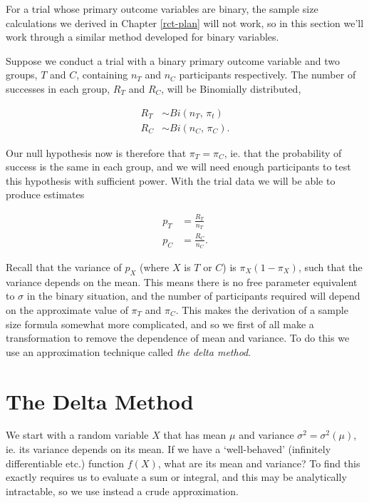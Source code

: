\documentclass[
  openany]{book}
\theoremstyle{definition}
\theoremstyle{definition}
\theoremstyle{definition}
\theoremstyle{definition}
\theoremstyle{remark}
\begin{document}
For a trial whose primary outcome variables are binary, the sample size calculations we derived in Chapter \ref{rct-plan} will not work, so in this section we'll work through a similar method developed for binary variables.

Suppose we conduct a trial with a binary primary outcome variable and two groups, \(T\) and \(C\), containing \(n_T\) and \(n_C\) participants respectively. The number of successes in each group, \(R_T\) and \(R_C\), will be Binomially distributed,

\begin{align*}
      R_T &\sim{Bi\left(n_T,\, \pi_t\right)} \\
      R_C &\sim{Bi\left(n_C,\,\pi_C\right)}.
\end{align*}

Our null hypothesis now is therefore that \(\pi_T = \pi_C\), ie. that the probability of success is the same in each group, and we will need enough participants to test this hypothesis with sufficient power. With the trial data we will be able to produce estimates

\begin{align*}
      p_T & = \frac{R_T}{n_T} \\
      p_C & = \frac{R_C}{n_C}.
\end{align*}

Recall that the variance of \(p_X\) (where \(X\) is \(T\) or \(C\)) is \(\pi_X\left(1-\pi_X\right)\), such that the variance depends on the mean. This means there is no free parameter equivalent to \(\sigma\) in the binary situation, and the number of participants required will depend on the approximate value of \(\pi_T\) and \(\pi_C\). This makes the derivation of a sample size formula somewhat more complicated, and so we first of all make a transformation to remove the dependence of mean and variance. To do this we use an approximation technique called \emph{the delta method}.

\hypertarget{delta-method}{%
\section{The Delta Method}\label{delta-method}}

We start with a random variable \(X\) that has mean \(\mu\) and variance \(\sigma^2 = \sigma^2\left(\mu\right)\), ie. its variance depends on its mean. If we have a `well-behaved' (infinitely differentiable etc.) function \(f\left(X\right)\), what are its mean and variance? To find this exactly requires us to evaluate a sum or integral, and this may be analytically intractable, so we use instead a crude approximation.
\end{document}
